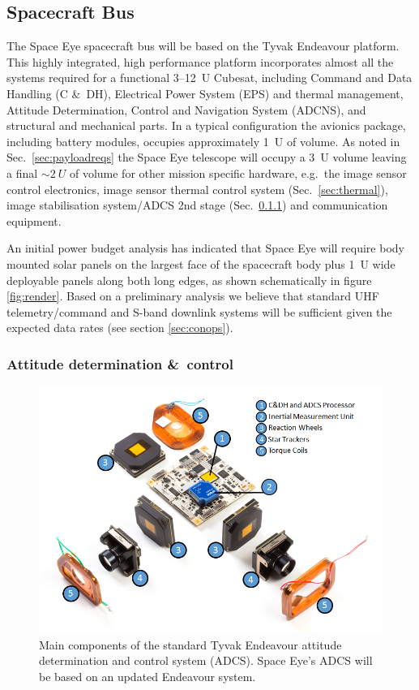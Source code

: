 \documentclass[]{iac}
\begin{document}
\subsection{Spacecraft Bus}

The Space Eye spacecraft bus will be based on the Tyvak Endeavour platform. This highly integrated, high performance
platform incorporates almost all the systems required for a functional 3--\SI{12}{U} Cubesat, including Command and Data
Handling (C \&\ DH),  Electrical Power System (EPS) and thermal management, Attitude Determination, Control and
Navigation System (ADCNS), and structural and mechanical parts.  In a typical configuration the avionics package,
including battery modules, occupies approximately \SI{1}{U} of volume.  As noted in Sec.~\ref{sec:payloadreqs} the Space
Eye telescope will occupy a \SI{3}{U} volume leaving a final $\sim\SI{2}{U}$ of volume for other mission specific
hardware, e.g.\ the image sensor control electronics, image sensor thermal control system (Sec.~\ref{sec:thermal}),
image stabilisation system/ADCS 2nd stage (Sec.~\ref{sec:adcs}) and communication equipment.

An initial power budget analysis has indicated that Space Eye will require body mounted solar panels on the largest face
of the spacecraft body plus \SI{1}{U} wide deployable panels along both long edges, as shown schematically in figure
\ref{fig:render}. Based on a preliminary analysis we believe that standard UHF telemetry/command and S-band downlink
systems will be sufficient given the expected data rates (see section \ref{sec:conops})\cite{Reisenfeld2015}.

\subsubsection{Attitude determination \&\ control}
\label{sec:adcs}

\begin{figure}[tp]
  \center \includegraphics[width=\columnwidth]{figures/adcs.png}
  \caption{\label{fig:adcs}Main components of the standard Tyvak Endeavour attitude determination and control system
    (ADCS). Space Eye's ADCS will be based on an updated Endeavour system.}
\end{figure}
\end{document}
